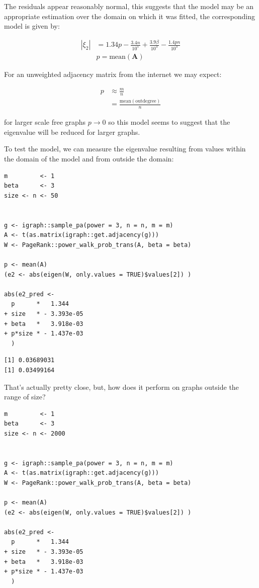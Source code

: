 \documentclass[11pt]{article}
\begin{document}
The residuals appear reasonably normal, this suggests that the model may be an appropriate estimation over the domain on which it was fitted, the corresponding model is given by:

\begin{align}
\left\lvert \xi_{2} \right\rvert &= 1.34 p -  \frac{3.4n}{10^{5}} + \frac{3.9\beta}{10^{3}} - \frac{1.4 p n}{10^{3}} \\
        &p = \mathrm{mean}\left( \mathbf{A}\right)
\end{align}

For an unweighted adjacency matrix from the internet we may expect:

\begin{align}
p &\approx \frac{m}{n} \\
  &= \frac{\mathrm{mean}\left(\mathrm{outdegree}\right)}{n}
\end{align}

for larger scale free graphs \(p \rightarrow 0\) so this model seems to suggest that the eigenvalue will be reduced for larger graphs.

To test the model, we can measure the eigenvalue resulting from values within the domain of the model and from outside the domain:

\begin{verbatim}
m         <- 1
beta      <- 3
size <- n <- 50


g <- igraph::sample_pa(power = 3, n = n, m = m)
A <- t(as.matrix(igraph::get.adjacency(g)))
W <- PageRank::power_walk_prob_trans(A, beta = beta)

p <- mean(A)
(e2 <- abs(eigen(W, only.values = TRUE)$values[2]) )

abs(e2_pred <-
  p      *   1.344
+ size   * - 3.393e-05
+ beta   *   3.918e-03
+ p*size * - 1.437e-03
  )
\end{verbatim}

\begin{verbatim}
[1] 0.03689031
[1] 0.03499164
\end{verbatim}


That's actually pretty close, but, how does it perform on graphs outside the range of size?

\begin{verbatim}
m         <- 1
beta      <- 3
size <- n <- 2000


g <- igraph::sample_pa(power = 3, n = n, m = m)
A <- t(as.matrix(igraph::get.adjacency(g)))
W <- PageRank::power_walk_prob_trans(A, beta = beta)

p <- mean(A)
(e2 <- abs(eigen(W, only.values = TRUE)$values[2]) )

abs(e2_pred <-
  p      *   1.344
+ size   * - 3.393e-05
+ beta   *   3.918e-03
+ p*size * - 1.437e-03
  )
\end{verbatim}
\end{document}
